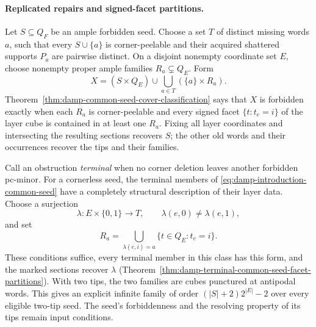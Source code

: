 \documentclass[11pt]{article}
\numberwithin{equation}{section}
\theoremstyle{definition}
\theoremstyle{remark}
\begin{document}
\paragraph{Replicated repairs and signed-facet partitions.}
Let \(S\subseteq Q_F\) be an ample forbidden seed.  Choose a set
\(T\) of distinct missing words \(a\), such that every
\(S\cup\{a\}\) is corner-peelable and their acquired shattered
supports \(P_a\) are pairwise distinct.  On a disjoint nonempty
coordinate set \(E\), choose nonempty proper ample families
\(R_a\subsetneq Q_E\).  Form
\begin{equation}
 X=(S\times Q_E)\cup\bigcup_{a\in T}(\{a\}\times R_a).
 \label{eq:damp-introduction-common-seed}
\end{equation}
Theorem~\ref{thm:damp-common-seed-cover-classification} says that
\(X\) is forbidden exactly when each \(R_a\) is corner-peelable
and every signed facet \(\{t:t_e=i\}\) of the layer cube is
contained in at least one \(R_a\).  Fixing all layer coordinates
and intersecting the resulting sections recovers \(S\); the other
old words and their occurrences recover the tips and their families.

Call an obstruction \emph{terminal} when no corner deletion leaves
another forbidden pc-minor.  For a cornerless seed, the terminal
members of \eqref{eq:damp-introduction-common-seed} have a completely
structural description of their layer data.  Choose a surjection
\[
 \lambda:E\times\{0,1\}\longrightarrow T,
 \qquad \lambda(e,0)\ne\lambda(e,1),
\]
and set
\[
 R_a=\bigcup_{\lambda(e,i)=a}\{t\in Q_E:t_e=i\}.
\]
These conditions suffice, every terminal member in this class has this
form, and the marked sections recover \(\lambda\)
(Theorem~\ref{thm:damp-terminal-common-seed-facet-partitions}).
With two tips, the two families are cubes punctured at antipodal words.
This gives an explicit infinite family of order
\((|S|+2)2^{|E|}-2\) over every eligible two-tip seed.
The seed's forbiddenness and the resolving property of its tips remain
input conditions.
\end{document}
